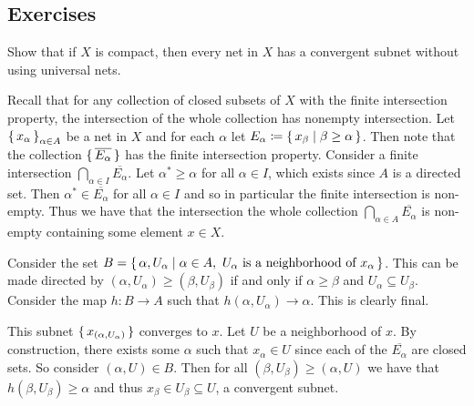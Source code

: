 \documentclass[letterpaper, 11pt]{article}
\begin{document}
\clearpage

\subsection*{Exercises}

\begin{exercise}
  Show that if $X$ is compact, then every net in $X$ has a convergent subnet without using universal nets.
\end{exercise}
\begin{pf}
  Recall that for any collection of closed subsets of $X$ with the finite intersection property, the intersection of the whole collection has nonempty intersection.
  Let $\set{x_{\alpha}}_{\alpha \in A}$ be a net in $X$ and for each $\alpha$ let $E_{\alpha} \coloneqq \set{x_{\beta} | \beta \geq \alpha}$.
  Then note that the collection $\set{\overline{E_{\alpha}}}$ has the finite intersection property.
  Consider a finite intersection $\bigcap_{\alpha \in I} \overline{E_{\alpha}}$.
  Let $\alpha^{*} \geq \alpha$ for all $\alpha \in I$, which exists since $A$ is a directed set.
  Then $\alpha^{*} \in \overline{E_{\alpha}}$ for all $\alpha \in I$ and so in particular the finite intersection is non-empty.
  Thus we have that the intersection the whole collection $\bigcap_{\alpha \in A} \overline{E_{\alpha}}$ is non-empty containing some element $x \in X$.

  Consider the set $B = \set{\alpha, U_{\alpha} | \alpha \in A,~ U_{\alpha} \text{ is a neighborhood of } x_{\alpha}}$.
  This can be made directed by $(\alpha, U_{\alpha}) \geq (\beta, U_{\beta})$ if and only if $\alpha \geq \beta$ and $U_{\alpha} \subseteq U_{\beta}$.
  Consider the map $h\colon B \to A$ such that $h(\alpha, U_{\alpha}) \to \alpha$.
  This is clearly final.

  This subnet $\set{x_{(\alpha, U_{\alpha})}}$ converges to $x$.
  Let $U$ be a neighborhood of $x$.
  By construction, there exists some $\alpha$ such that $x_{\alpha} \in U$ since each of the $\overline{E_{\alpha}}$ are closed sets.
  So consider $(\alpha, U) \in B$.
  Then for all $(\beta, U_{\beta}) \geq (\alpha, U)$ we have that $h(\beta, U_{\beta}) \geq \alpha$ and thus $x_{\beta} \in U_{\beta} \subseteq U$, a convergent subnet.
\end{pf}
\end{document}

